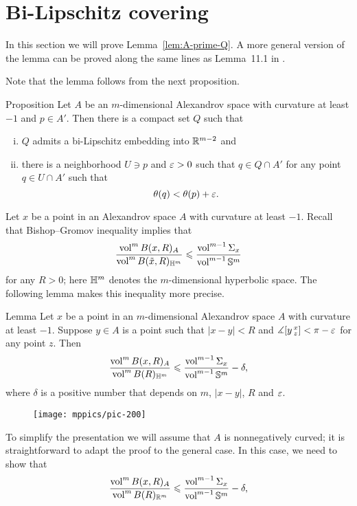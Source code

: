 \section{Bi-Lipschitz covering}\label{sec:bilip}

In this section we will prove Lemma~\ref{lem:A-prime-Q}.
A more general version of the lemma can be proved along the same lines as Lemma~11.1 in \cite{simon}.

Note that the lemma follows from the next proposition.


\begin{thm}{Proposition}\label{prop:Q-covering}
Let $A$ be an $m$-dimensional Alexandrov space with curvature at least $-1$ and $p\in A'$.
Then there is a compact set $Q$ such that 
\begin{enumerate}[(i)]
 \item $Q$ admits a bi-Lipschitz embedding into $\mathbb{R}^{m-2}$ and
 \item there is a neighborhood $U\ni p$ and $\varepsilon>0$ such that $q\in Q\cap A'$ for any point $q\in U\cap A'$ such that 
 \[\theta(q)<\theta(p)+\varepsilon.\]
\end{enumerate}
\end{thm}

Let $x$ be a point in an Alexandrov space $A$ with curvature at least $-1$.
Recall that Bishop--Gromov inequality implies that 
\[\frac{\operatorname{vol}^m B(x,R)_A}{\operatorname{vol}^m B(\tilde x,R)_{\mathbb{H}^m}}\leqslant \frac{\operatorname{vol}^{m-1} \Sigma_x}{\operatorname{vol}^{m-1} \mathbb{S}^m}\]
for any $R>0$; here $\mathbb{H}^m$ denotes the $m$-dimensional hyperbolic space.
The following lemma makes this inequality more precise. 

\begin{thm}{Lemma}
Let $x$ be a point in an $m$-dimensional Alexandrov space $A$ with curvature at least $-1$.
Suppose $y\in A$ is a point such that $|x-y|<R$ and $\measuredangle[y\,{}^{x}_{z}]<\pi-\varepsilon$ for any point $z$.
Then
\[\frac{\operatorname{vol}^m B(x,R)_A}{\operatorname{vol}^m B(R)_{\mathbb{H}^m}}\leqslant \frac{\operatorname{vol}^{m-1} \Sigma_x}{\operatorname{vol}^{m-1} \mathbb{S}^m}-\delta,\]
where $\delta$ is a positive number that depends on $m$, $|x-y|$, $R$ and $\varepsilon$.
 
\end{thm}

\begin{wrapfigure}{r}{35 mm}
\vskip-0mm
\centering
\texttt{[image: mppics/pic-200]}
\vskip0mm
\end{wrapfigure}

To simplify the presentation we will assume that $A$ is nonnegatively curved;
it is straightforward to adapt the proof to the general case.
In this case, we need to show that 
\[\frac{\operatorname{vol}^m B(x,R)_A}{\operatorname{vol}^m B(R)_{\mathbb{R}^m}}\leqslant \frac{\operatorname{vol}^{m-1} \Sigma_x}{\operatorname{vol}^{m-1} \mathbb{S}^m}-\delta,\]

